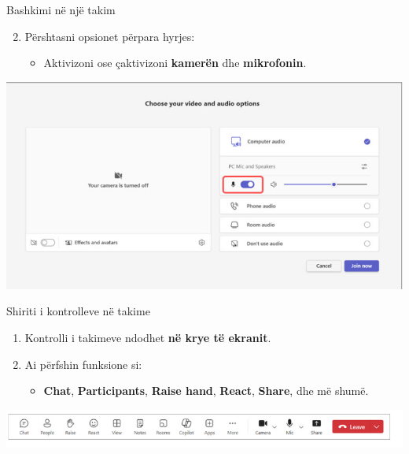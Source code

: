 \documentclass[
  ignorenonframetext,
]{beamer}
\providecommand{\tightlist}{%
  \setlength{\itemsep}{0pt}\setlength{\parskip}{0pt}}
\begin{document}
\begin{frame}{Bashkimi në një takim}
\label{bashkimi-nuxeb-njuxeb-takim-2}
\begin{enumerate}
\setcounter{enumi}{1}
\item
  Përshtasni opsionet përpara hyrjes:

  \begin{itemize}
  \tightlist
  \item
    Aktivizoni ose çaktivizoni \textbf{kamerën} dhe \textbf{mikrofonin}.
  \end{itemize}
\end{enumerate}

\includegraphics{./images/teams7.png}
\end{frame}

\begin{frame}{Shiriti i kontrolleve në takime}
\label{shiriti-i-kontrolleve-nuxeb-takime}
\begin{enumerate}
\item
  Kontrolli i takimeve ndodhet \textbf{në krye të ekranit}.
\item
  Ai përfshin funksione si:

  \begin{itemize}
  \tightlist
  \item
    \textbf{Chat}, \textbf{Participants}, \textbf{Raise hand},
    \textbf{React}, \textbf{Share}, dhe më shumë.
  \end{itemize}
\end{enumerate}

\includegraphics{./images/teams8.png}
\end{frame}
\end{document}
